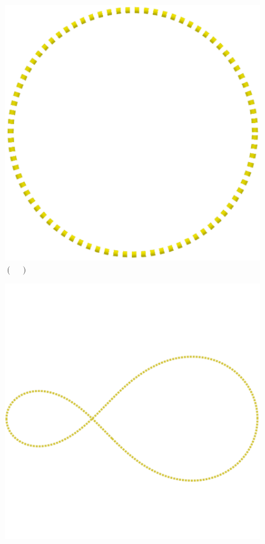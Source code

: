 \documentclass[a4paper, 12pt]{article}
\begin{document}
\begin{flushleft}
\begin{itemize}
\begin{itemize}
\begin{multicols}{2}
\begin{figure}[H]
							\includegraphics[scale=0.15]{./img/5b}
							\captionsetup{labelformat=empty}
							\caption{$(\quad)$}
						\end{figure}
						\begin{figure}[H]
							\centering
							\includegraphics[scale=0.15]{./img/5c}

\end{figure}
\end{multicols}
\end{itemize}
\end{itemize}
\end{flushleft}
\end{document}

